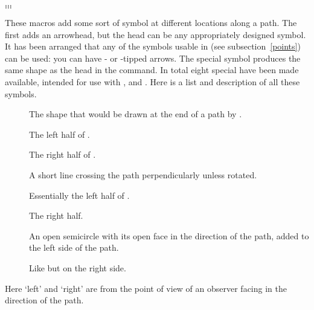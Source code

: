 \documentclass[letterpaper]{article}
\begin{document}
\begin{cd}
%
    $\ldots$\\
%
    $\ldots$\\
%
    $\ldots$%
%
%
\end{cd}

These macros add some sort of symbol at different locations along a
path. The first adds an arrowhead, but the head can be any appropriately
designed symbol. It has been arranged that any of the symbols usable in
 (see subsection~\ref{points}) can be used: you can have
- or -tipped arrows. The special symbol
 produces the same shape as the head in the 
command. In total eight special  have been made available,
intended for use with ,  and .
Here is a list and description of all these symbols.
\begin{description}
  \item[] The shape that
    would be drawn at the end of a path by .
  \item[] The left
    half of .
  \item[] The
    right half of .
  \item[] A short
    line crossing the path perpendicularly unless rotated.
  \item[] Essentially the left
    half of .
  \item[] The right half.
  \item[] An open
    semicircle with its open face in the direction of the path, added to
   the left side of the path.
  \item[] Like
     but on the right side.
\end{description}
Here `left' and `right' are from the point of view of an observer facing
in the direction of the path.
\end{document}
